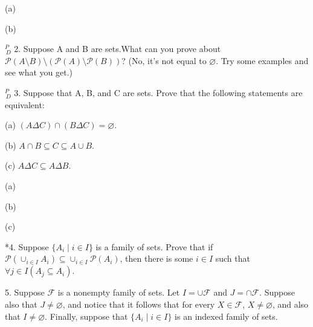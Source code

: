 \documentclass{article}
\begin{document}
\vspace{30pt}

(a)

\vspace{30pt}

(b)

\vspace{30pt}

$^{\textit{P}}_{\, \textit{D}}$ 2. Suppose A and B are sets.What can you prove about $\mathcal{P} (A \setminus B) \setminus (\mathcal{P} (A) \setminus \mathcal{P} (B))$? (No, it's not equal to $\varnothing$. Try some examples and see what you get.)


\vspace{30pt}


\vspace{30pt}

$^{\textit{P}}_{\, \textit{D}}$ 3. Suppose that A, B, and C are sets. Prove that the following statements
are equivalent:

\hspace{12pt}(a) $(A \Delta C) \cap (B \Delta C) = \varnothing$.

\hspace{12pt}(b) $A \cap B \subseteq C \subseteq A \cup B$.

\hspace{12pt}(c) $A \Delta C \subseteq A \Delta B$.


\vspace{30pt}

(a)

\vspace{30pt}

(b)

\vspace{30pt}

(c)

\vspace{30pt}

*4. Suppose $\{A_i \mid i \in I\}$ is a family of sets. Prove that if $\mathcal{P} (\cup_{i \in I} A_i) \subseteq
\cup_{i \in I} \mathcal{P} (A_i)$, then there is some $i \in I$ such that $\forall  j \in I (A_j \subseteq A_i)$.


\vspace{30pt}


\vspace{30pt}

5. Suppose $\mathcal{F}$ is a nonempty family of sets. Let $I = \cup \mathcal{F}$ and $J = \cap \mathcal{F}$.
Suppose also that $J \neq \varnothing$, and notice that it follows that for every $X \in \mathcal{F}$,
$X \neq \varnothing$, and also that $I \neq \varnothing$. Finally, suppose that $\{A_i \mid i \in I\}$ is an
indexed family of sets.
\end{document}
